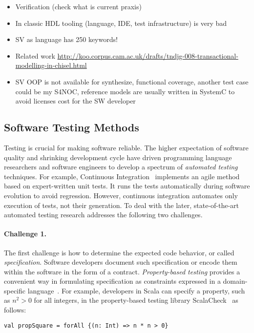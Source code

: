 \documentclass[fleqn,12pt]{article}
\begin{document}
\begin{itemize}
\item Verification (check what is current praxis)
\item In classic HDL tooling (language, IDE, test infrastructure) is very bad
\item SV as language has 250 keywords!
\item Related work \url{http://koo.corpus.cam.ac.uk/drafts/tndjg-008-transactional-modelling-in-chisel.html}
\item SV OOP is not available for synthesize, functional coverage, another test case could be my S4NOC, reference models are usually written in SystemC to avoid licenses cost for the SW developer
\end{itemize}


\subsection{Software Testing Methods}
Testing is crucial for making software reliable. The higher
expectation of software quality and shrinking development cycle have
driven programming language researchers and software engineers to
develop a spectrum of \emph{automated testing} techniques. For example,
Continuous Integration~\cite{duvall2007continuous} implements an agile
method based on expert-written unit tests. It runs the tests
automatically during software evolution to avoid regression.  However, continuous integration automates only execution
of tests, not their generation. To deal with the later,
state-of-the-art automated testing research addresses
the following two challenges.


\paragraph{Challenge 1.}
The first challenge is how to determine the expected code behavior, or
called \emph{specification}.  Software developers document such
specification or encode them within the software in the form of a
contract. \emph{Property-based testing} provides a convenient way in
formulating specification as constraints expressed in a
domain-specific language~\cite{DBLP:conf/icfp/ClaessenH00}.  For
example, developers in Scala can specify a property, such as $n^2>0$
for all integers, in the property-based testing library
ScalaCheck~\cite{nilsson2014scalacheck} as follows:
\begin{lstlisting}[numbers=none]
val propSquare = forAll {(n: Int) => n * n > 0}
\end{lstlisting}
\end{document}
